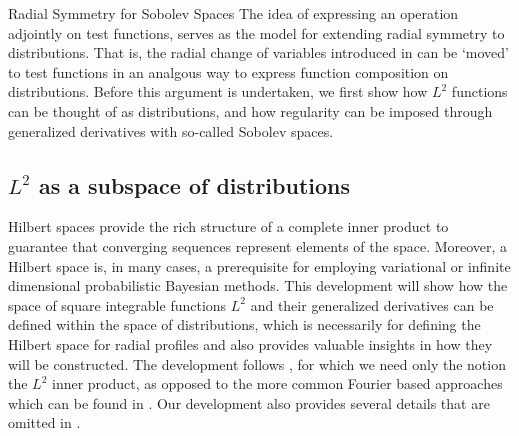 \begin{chapter}{Radial Symmetry for Sobolev Spaces}
The idea of expressing an operation adjointly on test functions, serves as the model for extending radial symmetry to distributions. 
That is, the radial change of variables introduced in  can be `moved' to test functions in an analgous way to express function composition on distributions.
Before this argument is undertaken, we first show how $L^2$ functions can be thought of as distributions, and how regularity can be imposed through generalized derivatives with so-called Sobolev spaces.

\subsection{$L^2$ as a subspace of distributions}

Hilbert spaces provide the rich structure of a complete inner product to guarantee that converging sequences represent elements of the space.
Moreover, a Hilbert space is, in many cases, a prerequisite for employing variational or infinite dimensional probabilistic Bayesian methods.
This development will show how the space of square integrable functions $L^2$ and their generalized derivatives can be defined within the space of distributions, which is necessarily for defining the Hilbert space for radial profiles and also provides valuable insights in how they will be constructed.
The development follows \citep{richtmyer1978principles,griffel2002}, for which we need only the notion the $L^2$ inner product, as opposed to the more common Fourier based approaches which can be found in \citep{rudin1991,hormander1983,strichartz2000}.
Our development also provides several details that are omitted in \citep{richtmyer1978principles}. 


\end{chapter}
